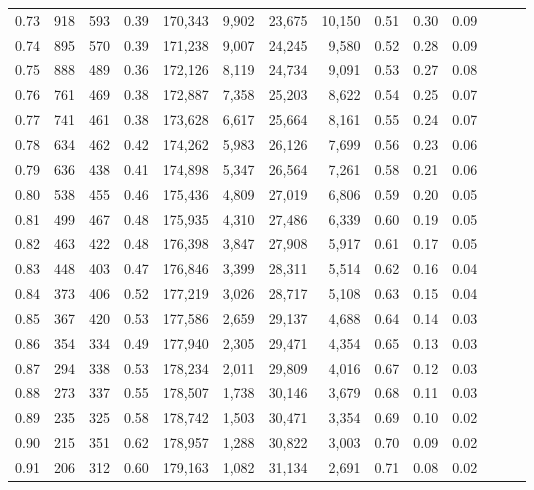 \begin{tabular}{rrrrrrrrrrrrrr}
0.73 &    918 &  593 &  0.39 &  170,343 &    9,902 &  23,675 &  10,150 &  0.51 &  0.30 &      0.09 \\
0.74 &    895 &  570 &  0.39 &  171,238 &    9,007 &  24,245 &   9,580 &  0.52 &  0.28 &      0.09 \\
0.75 &    888 &  489 &  0.36 &  172,126 &    8,119 &  24,734 &   9,091 &  0.53 &  0.27 &      0.08 \\
0.76 &    761 &  469 &  0.38 &  172,887 &    7,358 &  25,203 &   8,622 &  0.54 &  0.25 &      0.07 \\
0.77 &    741 &  461 &  0.38 &  173,628 &    6,617 &  25,664 &   8,161 &  0.55 &  0.24 &      0.07 \\
0.78 &    634 &  462 &  0.42 &  174,262 &    5,983 &  26,126 &   7,699 &  0.56 &  0.23 &      0.06 \\
0.79 &    636 &  438 &  0.41 &  174,898 &    5,347 &  26,564 &   7,261 &  0.58 &  0.21 &      0.06 \\
0.80 &    538 &  455 &  0.46 &  175,436 &    4,809 &  27,019 &   6,806 &  0.59 &  0.20 &      0.05 \\
0.81 &    499 &  467 &  0.48 &  175,935 &    4,310 &  27,486 &   6,339 &  0.60 &  0.19 &      0.05 \\
0.82 &    463 &  422 &  0.48 &  176,398 &    3,847 &  27,908 &   5,917 &  0.61 &  0.17 &      0.05 \\
0.83 &    448 &  403 &  0.47 &  176,846 &    3,399 &  28,311 &   5,514 &  0.62 &  0.16 &      0.04 \\
0.84 &    373 &  406 &  0.52 &  177,219 &    3,026 &  28,717 &   5,108 &  0.63 &  0.15 &      0.04 \\
0.85 &    367 &  420 &  0.53 &  177,586 &    2,659 &  29,137 &   4,688 &  0.64 &  0.14 &      0.03 \\
0.86 &    354 &  334 &  0.49 &  177,940 &    2,305 &  29,471 &   4,354 &  0.65 &  0.13 &      0.03 \\
0.87 &    294 &  338 &  0.53 &  178,234 &    2,011 &  29,809 &   4,016 &  0.67 &  0.12 &      0.03 \\
0.88 &    273 &  337 &  0.55 &  178,507 &    1,738 &  30,146 &   3,679 &  0.68 &  0.11 &      0.03 \\
0.89 &    235 &  325 &  0.58 &  178,742 &    1,503 &  30,471 &   3,354 &  0.69 &  0.10 &      0.02 \\
0.90 &    215 &  351 &  0.62 &  178,957 &    1,288 &  30,822 &   3,003 &  0.70 &  0.09 &      0.02 \\
0.91 &    206 &  312 &  0.60 &  179,163 &    1,082 &  31,134 &   2,691 &  0.71 &  0.08 &      0.02 \\

\end{tabular}
